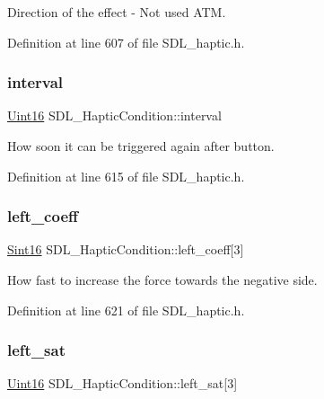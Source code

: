 Direction of the effect -\/ Not used A\+TM. 

Definition at line 607 of file S\+D\+L\+\_\+haptic.\+h.

\mbox{\label{struct_s_d_l___haptic_condition_aafc182abea1078bed7e9cf5d0e713ea2}} 
\subsubsection{\texorpdfstring{interval}{interval}}
{\footnotesize\ttfamily \mbox{\hyperlink{_s_d_l__stdinc_8h_a31fcc0a076c9068668173ee26d33e42b}{Uint16}} S\+D\+L\+\_\+\+Haptic\+Condition\+::interval}

How soon it can be triggered again after button. 

Definition at line 615 of file S\+D\+L\+\_\+haptic.\+h.

\mbox{\label{struct_s_d_l___haptic_condition_a2adf52c32f60f0b6826b1e3add2eae7a}} 
\subsubsection{\texorpdfstring{left\_coeff}{left\_coeff}}
{\footnotesize\ttfamily \mbox{\hyperlink{_s_d_l__stdinc_8h_a9d0257032c0e146ab6121bf0122712f5}{Sint16}} S\+D\+L\+\_\+\+Haptic\+Condition\+::left\+\_\+coeff\mbox{[}3\mbox{]}}

How fast to increase the force towards the negative side. 

Definition at line 621 of file S\+D\+L\+\_\+haptic.\+h.

\mbox{\label{struct_s_d_l___haptic_condition_a953448774c40818a4f47c6efea21124d}} 
\subsubsection{\texorpdfstring{left\_sat}{left\_sat}}
{\footnotesize\ttfamily \mbox{\hyperlink{_s_d_l__stdinc_8h_a31fcc0a076c9068668173ee26d33e42b}{Uint16}} S\+D\+L\+\_\+\+Haptic\+Condition\+::left\+\_\+sat\mbox{[}3\mbox{]}}

